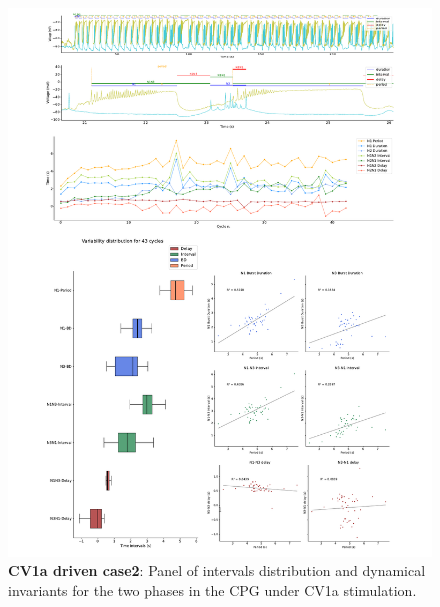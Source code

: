 \begin{figure}[htbp]
	\centering
	\includegraphics[width=1.1\textwidth]{./invariants/data/SUSSEX/CV1a_driven2/images/panel_with_intervals.pdf}
	
	\caption{\textbf{CV1a driven case2}: Panel of intervals distribution and dynamical invariants for the two phases in the CPG under CV1a stimulation.}
	\label{fig:cv1a 2 2phases}
\end{figure}



